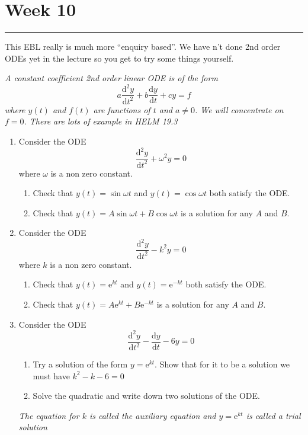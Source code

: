 \documentclass[11pt,a4paper]{article}
\newcommand{\diff}{\mathrm{d}}
\begin{document}



\section*{Week 10}
\hrule
\smallskip

This EBL really is much more ``enquiry based''. We have n't done 2nd order ODEs yet in the lecture so you get to try some things yourself.

{\em A constant coefficient 2nd order linear ODE is of the form
$$  a\frac{\diff^2 y}{\diff t^2}  + b \frac{\diff y}{\diff t} +c y = f $$
where $y(t)$ and $f(t)$ are functions of $t$ and $a\ne 0$. We will concentrate on $f=0$. There are lots of example in HELM 19.3}

\begin{enumerate}
\item Consider the ODE
$$  \frac{\diff^2y}{\diff t^2}  + \omega^2 y = 0 $$
where $\omega$ is a non zero constant.
\begin{enumerate}
\item Check that $y(t) = \sin \omega t$ and  $y(t) = \cos \omega t$ both satisfy the ODE.
\item Check that $y(t) = A \sin \omega t + B \cos \omega t$ is a solution for any $A$ and $B$.
\end{enumerate}

\item Consider the ODE
$$  \frac{\diff^2 y}{\diff t^2}  - k^2 y = 0 $$
where $k$ is a non zero constant.
\begin{enumerate}
\item Check that $y(t) = \mathrm{e}^{kt}$ and  $y(t) = \mathrm{e}^{-kt}$ both satisfy the ODE.
\item Check that $y(t) =A\mathrm{e}^{kt} + B\mathrm{e}^{-kt}$ is a solution for any $A$ and $B$.
\end{enumerate}


\item Consider the ODE
$$  \frac{\diff^2 y}{\diff t^2}  - \frac{\diff y}{\diff t} -6 y = 0 $$ 
\begin{enumerate}
\item Try a solution of the form $y=\mathrm{e}^{kt}$. Show that for it to be a solution we must have $k^2 -k -6=0$
\item Solve the quadratic and write down two solutions of the ODE.
\end{enumerate}

{\em The equation for $k$ is called the auxiliary equation and  $y=\mathrm{e}^{kt}$ is called a trial solution}


\end{enumerate}
\end{document}
